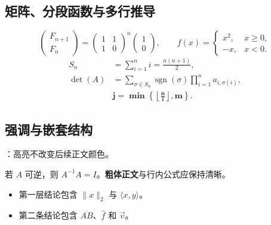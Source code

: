 \subsection{矩阵、分段函数与多行推导}
\[
 \begin{pmatrix}F_{n+1}\\F_n\end{pmatrix}
 =\begin{pmatrix}1&1\\1&0\end{pmatrix}^{n}
 \begin{pmatrix}1\\0\end{pmatrix},\qquad
 f(x)=\begin{cases}x^2,&x\geq0,\\-x,&x<0.\end{cases}
\]
\begin{align*}
 S_n&=\sum_{i=1}^{n}i=\frac{n(n+1)}{2},\\
 \det(A)&=\sum_{\sigma\in S_n}\operatorname{sgn}(\sigma)
                 \prod_{i=1}^{n}a_{i,\sigma(i)},\\
 &\boldsymbol{j=\min\left\{\left\lfloor\frac{n}{i}\right\rfloor,m\right\}}.
\end{align*}
\subsection{强调与嵌套结构}
：高亮不改变后续正文颜色。
\begin{quoteblock}
若 $A$ 可逆，则 $A^{-1}A=I$。\textbf{粗体正文}与行内公式应保持清晰。
\begin{itemize}
\item 第一层结论包含 $\lVert x\rVert_2$ 与 $\langle x,y\rangle$。
\item 第二条结论包含 $\overline{AB}$、$\widehat{f}$ 和 $\vec{v}$。
\end{itemize}
\end{quoteblock}
